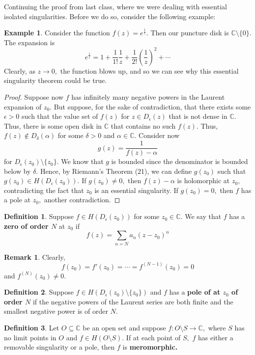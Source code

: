 \documentclass[10pt, oneside]{article}
\newcommand{\bbC}{\mathbb{C}}
\newcommand{\sm}{\setminus}
\theoremstyle{definition}
\newtheorem{exmp}{Example}[section]
\newtheorem{defn}{Definition}
\newtheorem{rem}{Remark}
\newcommand{\bbC}{\mathbb{C}}
\newcommand{\sm}{\setminus}
\begin{document}
Continuing the proof from last class, where we were dealing with essential isolated singularities. Before we do so, consider the following example:
\begin{exmp}
    Consider the function $f(z) = e^\frac{1}{z}.$ Then our puncture disk is $\bbC\sm \{0\}.$ The expansion is
    \[e^{\frac{1}{z}} = 1 + \frac{1}{1!}\frac{1}{z} + \frac{1}{2!}(\frac{1}{z})^2 + \cdots\] Clearly, as $z\to 0,$ the function blows up, and so we can see why this essential singularity theorem could be true.
\end{exmp}
\begin{proof}
Suppose now $f$ has infinitely many negative powers in the Laurent expansion of $z_0$. But suppose, for the sake of contradiction, that there exists some $\epsilon>0$ such that the value set of $f(z)$ for $z\in D_\epsilon(z)$ that is not dense in $\bbC.$ Thus, there is some open disk in $\bbC$ that contains no such $f(z).$ Thus, $f(z) \notin D_\delta(\alpha)$ for some $\delta>0$ and $\alpha \in \bbC.$ Consider now 
\[g(z) = \frac{1}{f(z) - \alpha}\] for $D_\epsilon(z_0)\sm \{z_0\}.$ We know that $g$ is bounded since the denominator is bounded below by $\delta.$ Hence, by Riemann's Theorem (21), we can define $g(z_0)$ such that $g(z_0) \in H(D_\epsilon(z_0)).$ If $g(z_0) \neq 0,$ then $f(z) - \alpha$ is holomorphic at $z_0,$ contradicting the fact that $z_0$ is an essential singularity. If $g(z_0) = 0,$ then $f$ has a pole at $z_0,$ another contradiction.
\end{proof}

\begin{defn}
Suppose $f\in H(D_\epsilon(z_0))$ for some $z_0 \in \bbC.$
    We say that $f$ has a \textbf{zero of order $N$} at $z_0$ if 
    \[f(z) = \sum_{n = N}a_n (z - z_0)^n\]
\end{defn}
\begin{rem}
    Clearly, 
    \[f(z_0) = f'(z_0) = \cdots = f^{(N-1)}(z_0)  =0\] and $f^{(N)}(z_0) \neq 0.$
\end{rem}


\begin{defn}
    Suppose $f \in H(D_\epsilon(z_0)\sm \{z_0\})$ and $f$ has a \textbf{pole of at $z_0 $ of order $N$} if the negative powers of the Laurent series are both finite and the smallest negative power is of order $N.$
\end{defn}

\begin{defn}
    Let $O\subseteq \bbC$ be an open set and suppose $f: O\sm S \to \bbC,$ where $S$ has no limit points in $O$ and $f \in H(O \sm S).$ If at each point of $S,$ $f$ has either a removable singularity or a pole, then $f$ is \textbf{meromorphic.}
\end{defn}
\end{document}
